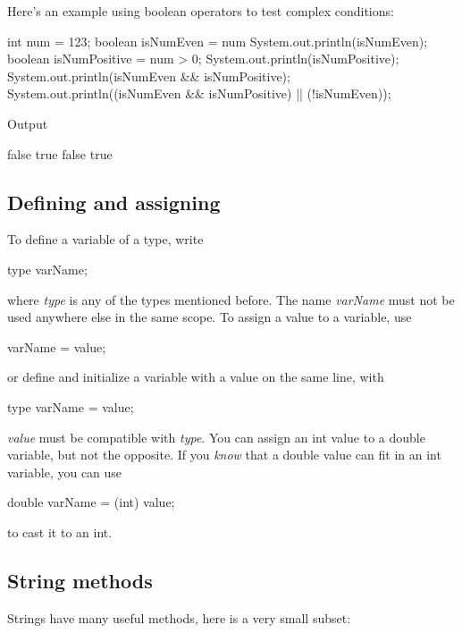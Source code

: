 Here's an example using boolean operators to test complex conditions:

\begin{code}
    int num = 123;
    boolean isNumEven = num %
    System.out.println(isNumEven);
    boolean isNumPositive = num > 0;
    System.out.println(isNumPositive);
    System.out.println(isNumEven && isNumPositive);
    System.out.println((isNumEven && isNumPositive) || (!isNumEven));  
\end{code}

Output
\begin{code}
false
true
false
true
\end{code}

\subsection{Defining and assigning}

To define a variable of a type, write 

\begin{code}
    type varName;
\end{code}

where \textit{type} is any of the types mentioned before. The name \textit{varName} must not be used anywhere else in the same scope. To assign a value to a variable, use

\begin{code}
varName = value;
\end{code}

or define and initialize a variable with a value on the same line, with

\begin{code}
type varName = value;
\end{code}

\textit{value} must be compatible with \textit{type}. You can assign an int value to a double variable, but not the opposite. If you \emph{know} that a double value can fit in an int variable, you can use 

\begin{code}
double varName = (int) value;
\end{code}

to cast it to an int.

\subsection{String methods}

Strings have many useful methods, here is a very small subset:

